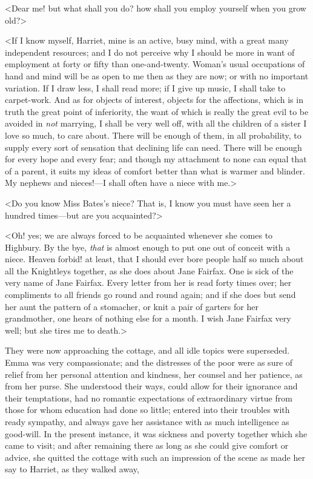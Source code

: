<Dear me! but what shall you do? how shall you employ yourself when you grow old?>

<If I know myself, Harriet, mine is an active, busy mind, with a great many independent resources; and I do not perceive why I should be more in want of employment at forty or fifty than one-and-twenty. Woman's usual occupations of hand and mind will be as open to me then as they are now; or with no important variation. If I draw less, I shall read more; if I give up music, I shall take to carpet-work. And as for objects of interest, objects for the affections, which is in truth the great point of inferiority, the want of which is really the great evil to be avoided in \textit{not} marrying, I shall be very well off, with all the children of a sister I love so much, to care about. There will be enough of them, in all probability, to supply every sort of sensation that declining life can need. There will be enough for every hope and every fear; and though my attachment to none can equal that of a parent, it suits my ideas of comfort better than what is warmer and blinder. My nephews and nieces!—I shall often have a niece with me.>

<Do you know Miss Bates's niece? That is, I know you must have seen her a hundred times—but are you acquainted?>

<Oh! yes; we are always forced to be acquainted whenever she comes to Highbury. By the bye, \textit{that} is almost enough to put one out of conceit with a niece. Heaven forbid! at least, that I should ever bore people half so much about all the Knightleys together, as she does about Jane Fairfax. One is sick of the very name of Jane Fairfax. Every letter from her is read forty times over; her compliments to all friends go round and round again; and if she does but send her aunt the pattern of a stomacher, or knit a pair of garters for her grandmother, one hears of nothing else for a month. I wish Jane Fairfax very well; but she tires me to death.>

They were now approaching the cottage, and all idle topics were superseded. Emma was very compassionate; and the distresses of the poor were as sure of relief from her personal attention and kindness, her counsel and her patience, as from her purse. She understood their ways, could allow for their ignorance and their temptations, had no romantic expectations of extraordinary virtue from those for whom education had done so little; entered into their troubles with ready sympathy, and always gave her assistance with as much intelligence as good-will. In the present instance, it was sickness and poverty together which she came to visit; and after remaining there as long as she could give comfort or advice, she quitted the cottage with such an impression of the scene as made her say to Harriet, as they walked away,

